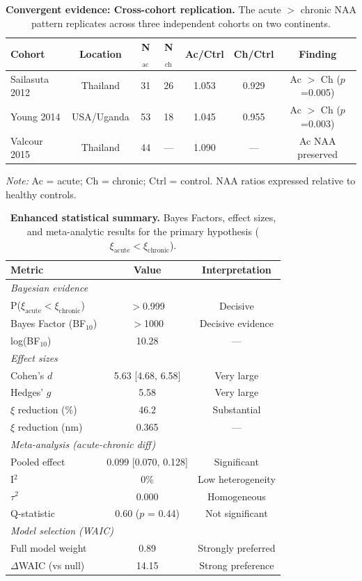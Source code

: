 \documentclass[10pt,a4paper]{article}
\begin{document}
\begin{table}[htbp]
\centering
\caption{\textbf{Convergent evidence: Cross-cohort replication.} The acute $>$ chronic NAA pattern replicates across three independent cohorts on two continents.}
\label{tab:convergent_cohorts}
\small
\begin{tabular}{lcccccc}
\toprule
\textbf{Cohort} & \textbf{Location} & \textbf{N$_{\text{ac}}$} & \textbf{N$_{\text{ch}}$} & \textbf{Ac/Ctrl} & \textbf{Ch/Ctrl} & \textbf{Finding} \\
\midrule
Sailasuta 2012 & Thailand & 31 & 26 & 1.053 & 0.929 & Ac $>$ Ch ($p$=0.005) \\
Young 2014 & USA/Uganda & 53 & 18 & 1.045 & 0.955 & Ac $>$ Ch ($p$=0.003) \\
Valcour 2015 & Thailand & 44 & --- & 1.090 & --- & Ac NAA preserved \\
\bottomrule
\end{tabular}
\smallskip

\noindent\textit{Note:} Ac = acute; Ch = chronic; Ctrl = control. NAA ratios expressed relative to healthy controls.
\end{table}

\begin{table}[htbp]
\centering
\caption{\textbf{Enhanced statistical summary.} Bayes Factors, effect sizes, and meta-analytic results for the primary hypothesis ($\xi_{\text{acute}} < \xi_{\text{chronic}}$).}
\label{tab:statistics}
\begin{tabular}{lcc}
\toprule
\textbf{Metric} & \textbf{Value} & \textbf{Interpretation} \\
\midrule
\multicolumn{3}{l}{\textit{Bayesian evidence}} \\
P($\xi_{\text{acute}} < \xi_{\text{chronic}}$) & $>$0.999 & Decisive \\
Bayes Factor (BF$_{10}$) & $>$1000 & Decisive evidence \\
log(BF$_{10}$) & 10.28 & --- \\
\midrule
\multicolumn{3}{l}{\textit{Effect sizes}} \\
Cohen's $d$ & 5.63 [4.68, 6.58] & Very large \\
Hedges' $g$ & 5.58 & Very large \\
$\xi$ reduction (\%) & 46.2 & Substantial \\
$\xi$ reduction (nm) & 0.365 & --- \\
\midrule
\multicolumn{3}{l}{\textit{Meta-analysis (acute-chronic diff)}} \\
Pooled effect & 0.099 [0.070, 0.128] & Significant \\
I$^2$ & 0\% & Low heterogeneity \\
$\tau^2$ & 0.000 & Homogeneous \\
Q-statistic & 0.60 ($p$ = 0.44) & Not significant \\
\midrule
\multicolumn{3}{l}{\textit{Model selection (WAIC)}} \\
Full model weight & 0.89 & Strongly preferred \\
$\Delta$WAIC (vs null) & 14.15 & Strong preference \\
\bottomrule
\end{tabular}
\end{table}



\end{document}
